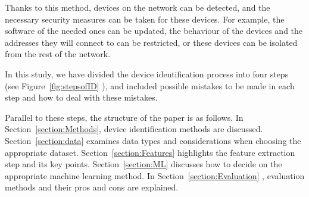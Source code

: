 \documentclass[journal]{IEEEtran}
\begin{document}
Thanks to this method, devices on the network can be detected, and the necessary security measures can be taken for these devices. For example, the software of the needed ones can be updated, the behaviour of the devices and the addresses they will connect to can be restricted, or these devices can be isolated from the rest of the network. 

In this study, we have divided the device identification process into four steps (see Figure~\ref{fig:stepsofID} ), and included possible mistakes to be made in each step and how to deal with these mistakes.

Parallel to these steps, the structure of the paper is as follows.
In Section~\ref{section:Methods}, device identification methods are discussed. Section~\ref{section:data} examines data types and considerations when choosing the appropriate dataset. Section~\ref{section:Features}  highlights the feature extraction step and its key points. Section~\ref{section:ML}   discusses how to decide on the appropriate machine learning method. In Section~\ref{section:Evaluation}  , evaluation methods and their pros and cons are explained.


\end{document}
